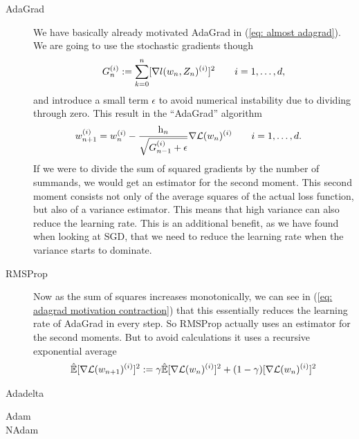 \begin{description}
	\item[AdaGrad] \parencite{duchiAdaptiveSubgradientMethods2011}
	We have basically already motivated AdaGrad in (\ref{eq: almost adagrad}).
	We are going to use the stochastic gradients though
	\begin{align*}
		G_n^{(i)} := \sum_{k=0}^n [\nabla l(w_n, Z_n)^{(i)}]^2 \qquad i=1,\dots,d,
	\end{align*}
	and introduce a small \parencite[i.e. \(\approx 10^{-8}\)][]{ruderOverviewGradientDescent2017}
	term \(\epsilon\) to avoid numerical instability due to dividing through zero.
	This result in the ``AdaGrad'' algorithm
	\begin{align*}
		w_{n+1}^{(i)}
		&= w_n^{(i)}
		- \frac{\text{h}_n}{\sqrt{G_{n-1}^{(i)}+\epsilon}}\nabla\mathcal{L}(w_n)^{(i)}
		\qquad i=1,\dots,d.
	\end{align*}
	If we were to divide the sum of squared gradients by the number of summands,
	we would get an estimator for the second moment. This second moment consists
	not only of the average squares of the actual loss function, but also of a
	variance estimator. This means that high variance can also reduce the learning
	rate. This is an additional benefit, as we have found when looking at SGD, that we
	need to reduce the learning rate when the variance starts to dominate.

	\item[RMSProp]\parencite[unpublished, see][]{ruderOverviewGradientDescent2017} Now as the sum of squares increases monotonically, we can see 
	in (\ref{eq: adagrad motivation contraction}) that this essentially reduces
	the learning rate of AdaGrad in every step. So RMSProp actually uses an
	estimator for the second moments. But to avoid calculations it uses a recursive
	exponential average
	\begin{align*}
		\hat{\mathbb{E}}[\nabla\mathcal{L}(w_{n+1})^{(i)}]^2
		:= \gamma \hat{\mathbb{E}}[\nabla\mathcal{L}(w_n)^{(i)}]^2
		+ (1-\gamma)[\nabla\mathcal{L}(w_n)^{(i)}]^2
	\end{align*}

	\item[Adadelta] \parencite{zeilerADADELTAAdaptiveLearning2012}
	\item[Adam]
	\item[NAdam]
\end{description}



\endinput
